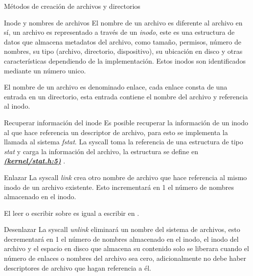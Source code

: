 \documentclass{libs/ufc_format}
\begin{document}
\begin{frame}{Métodos de creación de archivos y directorios}
  
\end{frame}
\begin{frame}{Inode y nombres de archivos}
  El nombre de un archivo es diferente al archivo en sí, un archivo es representado a través de un \textit{\emph{inodo}}, este es una estructura de datos que almacena metadatos del archivo, como tamaño, permisos, número de nombres, su tipo (archivo, directorio, dispositivo), su ubicación en disco y otras características dependiendo de la implementación. Estos inodos son identificados mediante un número unico.

  \vspace{0.3cm}

  El nombre de un archivo es denominado enlace, cada enlace consta de una entrada en un directorio, esta entrada contiene el nombre del archivo y referencia al inodo.
\end{frame}
\begin{frame}{Recuperar información del inode}
  Es posible recuperar la información de un inodo al que hace referencia un descriptor de archivo, para esto se implementa la llamada al sistema \textit{\emph{fstat}}. La syscall toma la referencia de una estructura de tipo \textit{\emph{stat}} y carga la información del archivo, la estructura se define en \href{https://github.com/CarlosSandoval-03/xv6-riscv/blob/riscv/kernel/stat.h\#L5}{\textit{\textbf{(kernel/stat.h:5)}}} \cite{xv6}.

  \vspace{0.3cm}

  
\end{frame}
\begin{frame}{Enlazar}
  La syscall \textit{\emph{link}} crea otro nombre de archivo que hace referencia al mismo inodo de un archivo existente. Esto incrementará en 1 el número de nombres almacenado en el inodo.
  
  El leer o escribir sobre \textit{} es igual a escribir en \textit{}.
\end{frame}
\begin{frame}{Desenlazar}
  La syscall \textit{\emph{unlink}} eliminará un nombre del sistema de archivos, esto decrementará en 1 el número de nombres almacenado en el inodo, el inodo del archivo y el espacio en disco que almacena su contenido solo se liberara cuando el número de enlaces o nombres del archivo sea cero, adicionalmente no debe haber descriptores de archivo que hagan referencia a él.
  
\end{frame}
\end{document}
